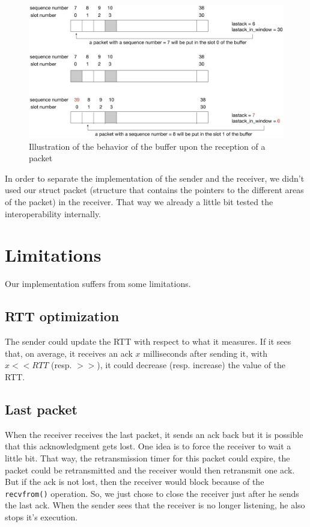\documentclass[11pt,a4paper]{article}
\begin{document}
\begin{figure}[!h]
	\begin{center}
		\includegraphics[width=15cm]{images/buffer.eps}
		\caption{Illustration of the behavior of the buffer upon the reception of a packet}
		\label{buffer}
	\end{center}
\end{figure}

In order to separate the implementation of the sender and the receiver, we didn't used our struct packet (structure that contains the pointers to the different areas of the packet) in the receiver. That way we already a little bit tested the interoperability internally.

\section{Limitations}

Our implementation suffers from some limitations.

\subsection{RTT optimization} The sender could update the RTT with respect to what it measures. If it sees that, on average, it receives an ack $x$ milliseconds after sending it, with $x << RTT$ (resp. $>>$), it could decrease (resp. increase) the value of the RTT.

\subsection{Last packet}
When the receiver receives the last packet, it sends an ack back but it is possible that this acknowledgment gets lost. One idea is to force the receiver to wait a little bit. That way, the retransmission timer for this packet could expire, the packet could be retransmitted and the receiver would then retransmit one ack. But if the ack is not lost, then the receiver would block because of the \texttt{recvfrom()} operation. So, we just chose to close the receiver just after he sends the last ack. When the sender sees that the receiver is no longer listening, he also stops it's execution.
\end{document}
